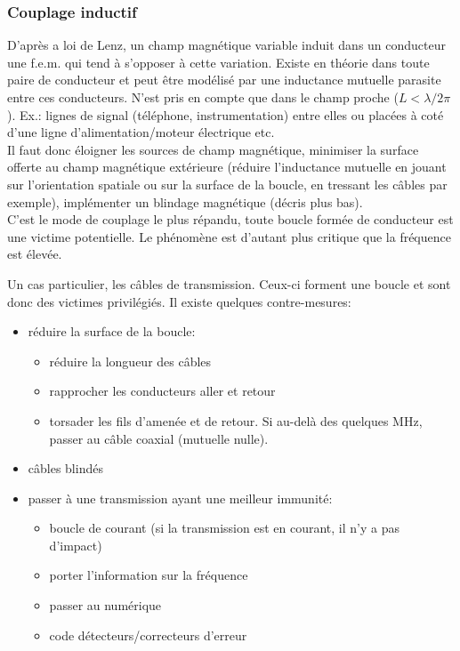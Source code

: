 \subsubsection{Couplage inductif}
D'après a loi de Lenz, un champ magnétique variable induit dans un conducteur une f.e.m. qui tend à s'opposer à cette variation. Existe en théorie dans toute paire de conducteur et peut être modélisé par une inductance mutuelle parasite entre ces conducteurs. N'est pris en compte que dans le champ proche (\(L<\lambda/2\pi\)). Ex.: lignes de signal (téléphone, instrumentation) entre elles ou placées à coté d'une ligne d'alimentation/moteur électrique etc.\\

Il faut donc éloigner les sources de champ magnétique, minimiser la surface offerte au champ magnétique extérieure (réduire l'inductance mutuelle en jouant sur l'orientation spatiale ou sur la surface de la boucle, en tressant les câbles par exemple), implémenter un blindage magnétique (décris plus bas).\\
C'est le mode de couplage le plus répandu, toute boucle formée de conducteur est une victime potentielle. Le phénomène est d'autant plus critique que la fréquence est élevée. 

Un cas particulier, les câbles de transmission. Ceux-ci forment une boucle et sont donc des victimes privilégiés. Il existe quelques contre-mesures:
\begin{itemize}
	\item réduire la surface de la boucle:
	\begin{itemize}
		\item réduire la longueur des câbles
		\item rapprocher les conducteurs aller et retour
		\item torsader les fils d'amenée et de retour. Si au-delà des quelques \si{\mega\hertz}, passer au câble coaxial (mutuelle nulle).
	\end{itemize}
	\item câbles blindés
	\item passer à une transmission ayant une meilleur immunité:
	\begin{itemize}
		\item boucle de courant (si la transmission est en courant, il n'y a pas d'impact)
		\item porter l'information sur la fréquence
		\item passer au numérique
		\item code détecteurs/correcteurs d'erreur
	\end{itemize}
\end{itemize}

